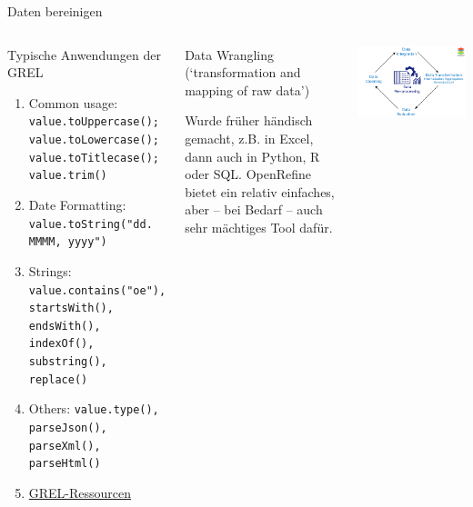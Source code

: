 \begin{frame}{Daten bereinigen}
 
\begin{columns}
\begin{block}{Typische Anwendungen der GREL}
\begin{enumerate}\footnotesize
    \item Common usage: \texttt{value.toUppercase(); value.toLowercase(); value.toTitlecase(); value.trim()}
    \item Date Formatting: \texttt{value.toString("dd. MMMM, yyyy")}
    \item Strings: \verb|value.contains("oe"), startsWith(), endsWith(), indexOf(), substring(), replace()|
    \item Others: \texttt{value.type(), parseJson(), parseXml(), parseHtml() }
    \item \href{https://github.com/OpenRefine/OpenRefine/wiki/GREL-Functions}{GREL-Ressourcen}
\end{enumerate}
\end{block}
  \begin{exampleblock}{Data Wrangling}\footnotesize
  (`transformation and mapping of raw data')
  
Wurde früher händisch gemacht, z.B. in Excel, dann auch in Python, R oder SQL. 
OpenRefine bietet ein relativ einfaches, aber -- bei Bedarf -- auch sehr mächtiges Tool dafür.
\end{exampleblock}
\bigskip 

\includegraphics[width=\textwidth]{img/data-cleaning-openrefine.png}
      

\end{columns}
\end{frame}
